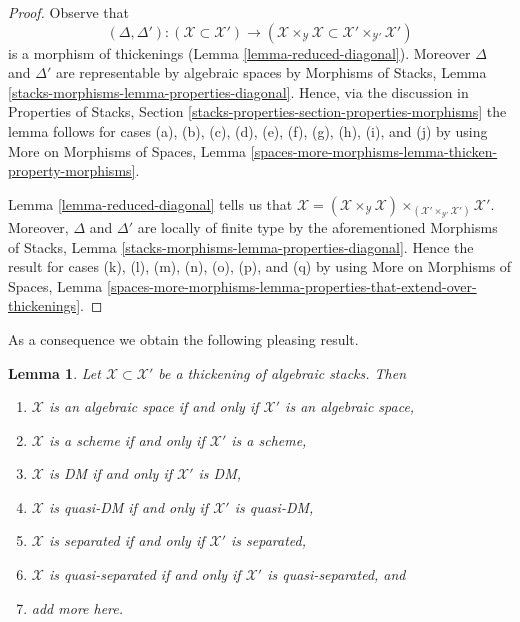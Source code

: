 \documentclass{stacks-project}
\newenvironment{reference}{\comment}{\endcomment}
\theoremstyle{plain}
\newtheorem{lemma}[subsection]{Lemma}
\theoremstyle{definition}
\theoremstyle{remark}
\numberwithin{equation}{subsection}
\begin{document}
\begin{proof}
Observe that
$$
(\Delta, \Delta') :
(\mathcal{X} \subset \mathcal{X}')
\longrightarrow
(\mathcal{X} \times_\mathcal{Y} \mathcal{X} \subset
\mathcal{X}' \times_{\mathcal{Y}'} \mathcal{X}')
$$
is a morphism of thickenings (Lemma \ref{lemma-reduced-diagonal}).
Moreover $\Delta$ and $\Delta'$ are
representable by algebraic spaces by
Morphisms of Stacks, Lemma \ref{stacks-morphisms-lemma-properties-diagonal}.
Hence, via the discussion in
Properties of Stacks, Section
\ref{stacks-properties-section-properties-morphisms}
the lemma follows for cases (a), (b), (c), (d),
(e), (f), (g), (h), (i), and (j) by using
More on Morphisms of Spaces, Lemma
\ref{spaces-more-morphisms-lemma-thicken-property-morphisms}.

\medskip\noindent
Lemma \ref{lemma-reduced-diagonal} tells us that
$\mathcal{X} = (\mathcal{X} \times_\mathcal{Y} \mathcal{X})
\times_{(\mathcal{X}' \times_{\mathcal{Y}'} \mathcal{X}')} \mathcal{X}'$.
Moreover, $\Delta$ and $\Delta'$ are locally of finite type by
the aforementioned
Morphisms of Stacks, Lemma \ref{stacks-morphisms-lemma-properties-diagonal}.
Hence the result for cases (k), (l), (m), (n), (o), (p), and (q) by using
More on Morphisms of Spaces, Lemma
\ref{spaces-more-morphisms-lemma-properties-that-extend-over-thickenings}.
\end{proof}

\noindent
As a consequence we obtain the following pleasing result.

\begin{lemma}
\label{lemma-thickening-properties}
\begin{reference}
\cite[Theorem 2.2.5]{Conrad-moduli}
\end{reference}
Let $\mathcal{X} \subset \mathcal{X}'$ be a thickening of algebraic
stacks. Then
\begin{enumerate}
\item $\mathcal{X}$ is an algebraic space if and only if $\mathcal{X}'$
is an algebraic space,
\item $\mathcal{X}$ is a scheme if and only if $\mathcal{X}'$ is a scheme,
\item $\mathcal{X}$ is DM if and only if $\mathcal{X}'$ is DM,
\item $\mathcal{X}$ is quasi-DM if and only if $\mathcal{X}'$ is quasi-DM,
\item $\mathcal{X}$ is separated if and only if $\mathcal{X}'$ is separated,
\item $\mathcal{X}$ is quasi-separated if and only if $\mathcal{X}'$ is
quasi-separated, and
\item add more here.
\end{enumerate}
\end{lemma}
\end{document}
